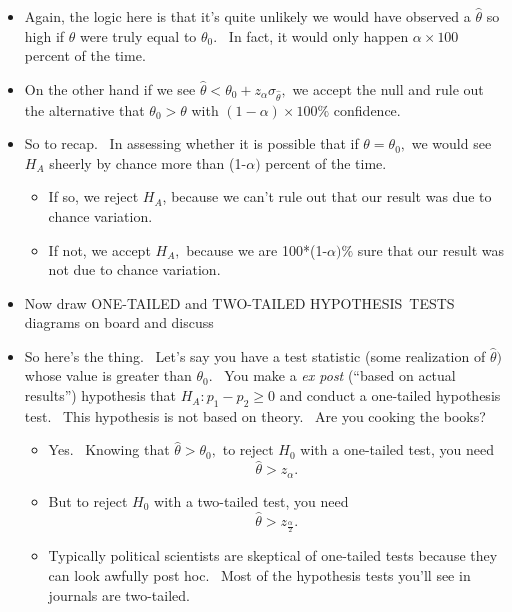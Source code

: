 \documentclass[11pt]{article}
\begin{document}
\begin{itemize}
\item Again, the logic here is that it's quite unlikely we would have
observed a $\widehat{\theta }$ so high if $\theta $ were truly equal to $%
\theta _{0}.$ \ In fact, it would only happen $\alpha \times 100$ percent of
the time.

\item On the other hand if we see $\widehat{\theta }<\theta _{0}+z_{\alpha
}\sigma _{\widehat{\theta }},$ we accept the null and rule out the
alternative that $\theta _{0}>\theta $ with $\left( 1-\alpha \right) \times
100\%$ confidence.

\item So to recap. \ In assessing whether it is possible that if $\theta
=\theta _{0},$ we would see $H_{A}$ sheerly by chance more than (1-$\alpha )$
percent of the time. \ 

\begin{itemize}
\item If so, we reject $H_{A}$, because we can't rule out that our result
was due to chance variation.

\item If not, we accept $H_{A},$ because we are 100*(1-$\alpha )\%$ sure
that our result was not due to chance variation.
\end{itemize}

\item Now draw ONE-TAILED and TWO-TAILED HYPOTHESIS\ TESTS diagrams on board
and discuss

\item So here's the thing. \ Let's say you have a test statistic (some
realization of $\widehat{\theta })$ whose value is greater than $\theta
_{0}. $ \ You make a \textit{ex post }(\textquotedblleft based on actual
results\textquotedblright ) hypothesis that $H_{A}:p_{1}-p_{2}\geq 0$ and
conduct a one-tailed hypothesis test. \ This hypothesis is not based on
theory. \ Are you cooking the books?

\begin{itemize}
\item Yes. \ Knowing that $\widehat{\theta }>\theta _{0},$ to reject $H_{0}$
with a one-tailed test, you need%
\begin{equation*}
\widehat{\theta }>z_{\alpha }.
\end{equation*}

\item But to reject $H_{0}$ with a two-tailed test, you need%
\begin{equation*}
\widehat{\theta }>z_{\frac{\alpha }{2}}.
\end{equation*}

\item Typically political scientists are skeptical of one-tailed tests
because they can look awfully post hoc. \ Most of the hypothesis tests
you'll see in journals are two-tailed.
\end{itemize}
\end{itemize}
\end{document}
